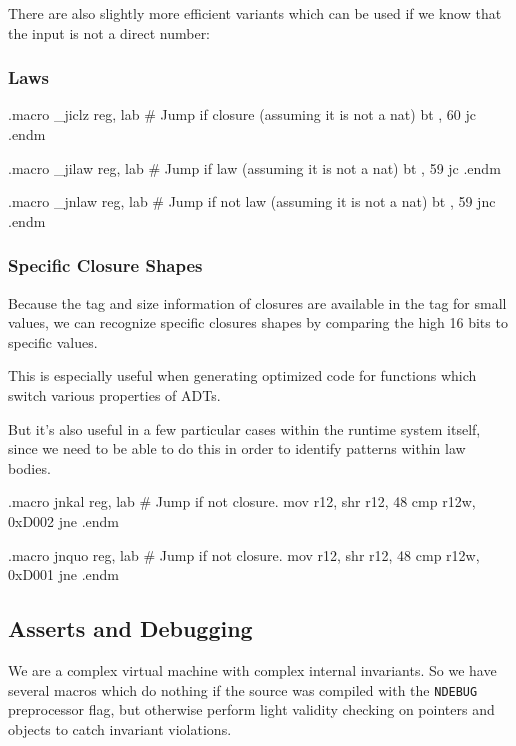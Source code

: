 There are also slightly more efficient variants which can be used if we
know that the input is not a direct number:

\subsubsection{Laws}

\begin{asm}
.macro _jiclz reg, lab # Jump if closure (assuming it is not a nat)
	bt	\reg, 60
	jc	\lab
.endm

.macro _jilaw reg, lab # Jump if law (assuming it is not a nat)
	bt	\reg, 59
	jc	\lab
.endm

.macro _jnlaw reg, lab # Jump if not law (assuming it is not a nat)
	bt	\reg, 59
	jnc	\lab
.endm
\end{asm}

\subsubsection{Specific Closure Shapes}

Because the tag and size information of closures are available in the tag
for small values, we can recognize specific closures shapes by comparing
the high 16 bits to specific values.

This is especially useful when generating optimized code for functions
which switch various properties of ADTs.

But it's also useful in a few particular cases within the runtime system
itself, since we need to be able to do this in order to identify patterns
within law bodies.

\begin{asm}
.macro jnkal reg, lab                       # Jump if not closure.
	mov	r12, \reg
	shr	r12, 48
	cmp	r12w, 0xD002
	jne	\lab
.endm
\end{asm}

\begin{asm}
.macro jnquo reg, lab                       # Jump if not closure.
	mov	r12, \reg
	shr	r12, 48
	cmp	r12w, 0xD001
	jne	\lab
.endm
\end{asm}

\subsection{Asserts and Debugging}

We are a complex virtual machine with complex internal invariants. So we have
several macros which do nothing if the source was compiled with
the \lstinline|NDEBUG| preprocessor flag, but otherwise perform light validity
checking on pointers and objects to catch invariant violations.

